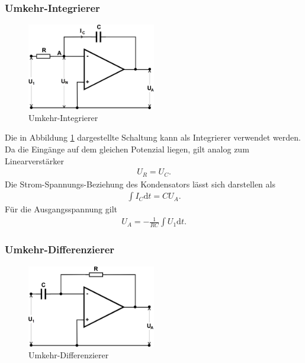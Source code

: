 \subsubsection{Umkehr-Integrierer}

\begin{figure}
	\centering
	\includegraphics[width=0.5\textwidth]{img/int.png}
	\caption{Umkehr-Integrierer \cite{v51}}
	\label{fig:int}
\end{figure}

Die in Abbildung \ref{fig:int} dargestellte Schaltung kann als Integrierer verwendet werden.
Da die Eingänge auf dem gleichen Potenzial liegen, gilt analog zum Linearverstärker
\begin{align}
	U_R = U_C.
\end{align}
Die Strom-Spannungs-Beziehung des Kondensators lässt sich darstellen als
\begin{align}
	\int I_C \text{d}t = C U_A.
\end{align}
Für die Ausgangsspannung gilt
\begin{align}
	U_A = -\frac{1}{RC} \int U_1 \text{d}t.
\end{align}


\subsubsection{Umkehr-Differenzierer}

\begin{figure}
	\centering
	\includegraphics[width=0.5\textwidth]{img/diff.png}
	\caption{Umkehr-Differenzierer \cite{v51}}
	\label{fig:diff}
\end{figure}

